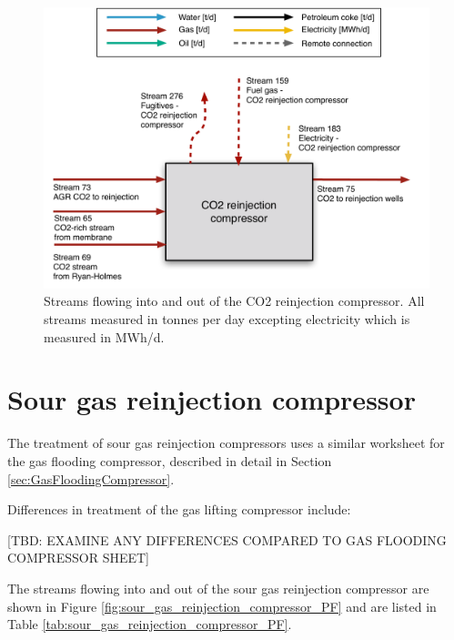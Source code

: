 \documentclass[11pt]{report}
\begin{document}
{%
\begin{figure}
\includegraphics[width=0.85\columnwidth]{images/CO2_reinjection_compressor_PF.pdf}
\caption{Streams flowing into and out of the CO2 reinjection compressor. All streams measured in tonnes per day excepting electricity which is measured in MWh/d.}
\label{fig:CO2_reinjection_compressor_PF}
\end{figure}




\clearpage

\section{Sour gas reinjection compressor}
\label{sec:sour_gas_reinjection_compressor}

The treatment of sour gas reinjection compressors uses a similar worksheet for the gas flooding compressor, described in detail in Section \ref{sec:GasFloodingCompressor}.

Differences in treatment of the gas lifting compressor include:

[TBD: EXAMINE ANY DIFFERENCES COMPARED TO GAS FLOODING COMPRESSOR SHEET]

The streams flowing into and out of the sour gas reinjection compressor are shown in Figure \ref{fig:sour_gas_reinjection_compressor_PF} and are listed in Table \ref{tab:sour_gas_reinjection_compressor_PF}.


}
\end{document}
